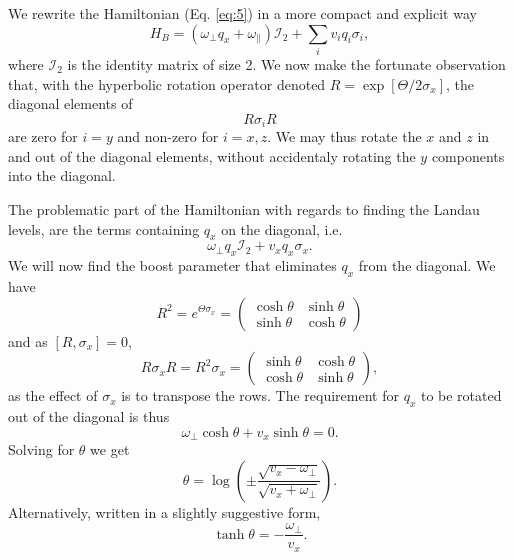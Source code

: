 We rewrite the Hamiltonian (Eq. \eqref{eq:5}) in a more compact and explicit way
\begin{equation}
  \label{eq:8}
  H_{B} = \left(\omega _{\perp} q_{x} + \omega _{\parallel}\right) \mathcal{I}_2 + \sum_i v_{i} q_{i} \sigma _{i},
\end{equation}
where \(\mathcal{I}_{2}\) is the identity matrix of size 2.
We now make the fortunate observation that, with the hyperbolic rotation operator denoted \( R = \exp [\Theta / 2 \sigma_{x}]\), the diagonal elements of
\[
R \sigma_{i} R
\]
are zero for $i=y$ and non-zero for \(i=x,z\).
We may thus rotate the \(x\) and \(z\) in and out of the diagonal elements, without accidentaly rotating the \(y\) components into the diagonal.

The problematic part of the Hamiltonian with regards to finding the Landau levels, are the terms containing \(q_{x}\) on the diagonal, i.e.
\[
  \omega _{\perp} q_{x} \mathcal{I}_{2} + v_{x} q_{x} \sigma _{x}.
\]
We will now find the boost parameter that eliminates \(q_{x}\) from the diagonal.
We have
\begin{equation}
  \label{eq:9}
  R^{2} = e^{\Theta \sigma _{x} } =
  \begin{pmatrix}
    \cosh \theta & \sinh \theta \\
    \sinh \theta & \cosh \theta
  \end{pmatrix}
\end{equation}
and as $[R, \sigma_{x}] = 0$,
\begin{equation}
  \label{eq:10}
  R \sigma _{x} R =  R^{2} \sigma _{x} =
  \begin{pmatrix}
    \sinh \theta & \cosh \theta \\
    \cosh \theta & \sinh \theta
  \end{pmatrix},
\end{equation}
as the effect of \(\sigma _{x}\) is to transpose the rows.
The requirement for \(q_{x}\) to be rotated out of the diagonal is thus
\begin{equation}
  \label{eq:11}
  \omega _{\perp} \cosh \theta + v_{x} \sinh \theta = 0.
\end{equation}
Solving for \(\theta \) we get
\begin{equation}
  \label{eq:12}
  \theta = \log (
  \pm \frac{\sqrt{v_{x} - \omega _{\perp}}}{\sqrt{v_{x} + \omega _{\perp}}}
  ).
\end{equation}
Alternatively, written in a slightly suggestive form,
\begin{equation}
  \label{eq:13}
  \tanh \theta =
  - \frac{\omega _{\perp}}{v_{x}}.
\end{equation}

